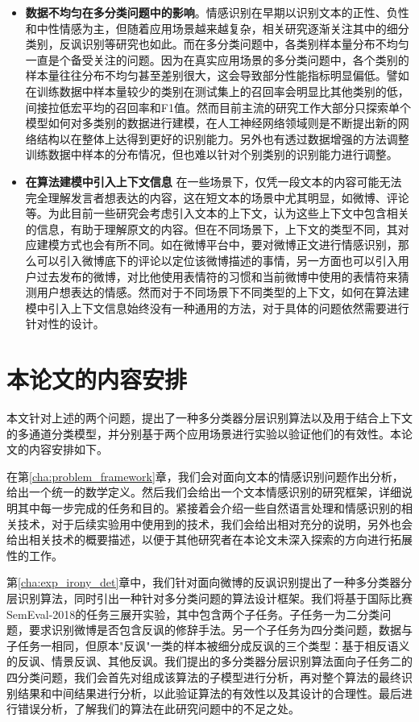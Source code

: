 \begin{itemize}

\item {\bf 数据不均匀在多分类问题中的影响}。情感识别在早期以识别文本的正性、负性和中性情感为主，但随着应用场景越来越复杂，相关研究逐渐关注其中的细分类别，反讽识别等研究也如此。而在多分类问题中，各类别样本量分布不均匀一直是个备受关注的问题。因为在真实应用场景的多分类问题中，各个类别的样本量往往分布不均匀甚至差别很大，这会导致部分性能指标明显偏低。譬如在训练数据中样本量较少的类别在测试集上的召回率会明显比其他类别的低，间接拉低宏平均的召回率和F1值。然而目前主流的研究工作大部分只探索单个模型如何对多类别的数据进行建模，在人工神经网络领域则是不断提出新的网络结构以在整体上达得到更好的识别能力。另外也有透过数据增强的方法调整训练数据中样本的分布情况，但也难以针对个别类别的识别能力进行调整。

\item {\bf 在算法建模中引入上下文信息} 在一些场景下，仅凭一段文本的内容可能无法完全理解发言者想表达的内容，这在短文本的场景中尤其明显，如微博、评论等。为此目前一些研究会考虑引入文本的上下文，认为这些上下文中包含相关的信息，有助于理解原文的内容。但在不同场景下，上下文的类型不同，其对应建模方式也会有所不同。如在微博平台中，要对微博正文进行情感识别，那么可以引入微博底下的评论以定位该微博描述的事情，另一方面也可以引入用户过去发布的微博，对比他使用表情符的习惯和当前微博中使用的表情符来猜测用户想表达的情感。然而对于不同场景下不同类型的上下文，如何在算法建模中引入上下文信息始终没有一种通用的方法，对于具体的问题依然需要进行针对性的设计。

\end{itemize}

\section{本论文的内容安排}

本文针对上述的两个问题，提出了一种多分类器分层识别算法以及用于结合上下文的多通道分类模型，并分别基于两个应用场景进行实验以验证他们的有效性。本论文的内容安排如下。

在第\ref{cha:problem_framework}章，我们会对面向文本的情感识别问题作出分析，给出一个统一的数学定义。然后我们会给出一个文本情感识别的研究框架，详细说明其中每一步完成的任务和目的。紧接着会介绍一些自然语言处理和情感识别的相关技术，对于后续实验用中使用到的技术，我们会给出相对充分的说明，另外也会给出相关技术的概要描述，以便于其他研究者在本论文未深入探索的方向进行拓展性的工作。

第\ref{cha:exp_irony_det}章中，我们针对面向微博的反讽识别提出了一种多分类器分层识别算法，同时引出一种针对多分类问题的算法设计框架。我们将基于国际比赛SemEval-2018的任务三\cite{van2018semeval}展开实验，其中包含两个子任务。子任务一为二分类问题，要求识别微博是否包含反讽的修辞手法。另一个子任务为四分类问题，数据与子任务一相同，但原本"反讽"一类的样本被细分成反讽的三个类型：基于相反语义的反讽、情景反讽、其他反讽。我们提出的多分类器分层识别算法面向子任务二的四分类问题，我们会首先对组成该算法的子模型进行分析，再对整个算法的最终识别结果和中间结果进行分析，以此验证算法的有效性以及其设计的合理性。最后进行错误分析，了解我们的算法在此研究问题中的不足之处。

